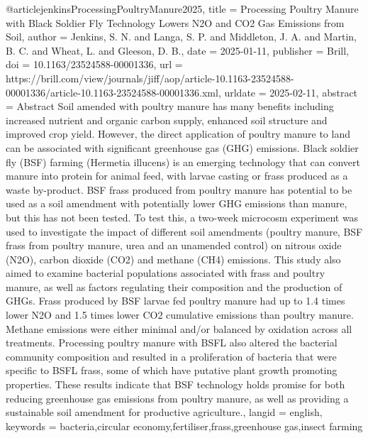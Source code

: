 {{{{@article{jenkinsProcessingPoultryManure2025,
  title = {Processing Poultry Manure with Black Soldier Fly Technology Lowers {{N2O}} and {{CO2}} Gas Emissions from Soil},
  author = {Jenkins, S. N. and Langa, S. P. and Middleton, J. A. and Martin, B. C. and Wheat, L. and Gleeson, D. B.},
  date = {2025-01-11},
  publisher = {Brill},
  doi = {10.1163/23524588-00001336},
  url = {https://brill.com/view/journals/jiff/aop/article-10.1163-23524588-00001336/article-10.1163-23524588-00001336.xml},
  urldate = {2025-02-11},
  abstract = {Abstract Soil amended with poultry manure has many benefits including increased nutrient and organic carbon supply, enhanced soil structure and improved crop yield. However, the direct application of poultry manure to land can be associated with significant greenhouse gas (GHG) emissions. Black soldier fly (BSF) farming (Hermetia illucens) is an emerging technology that can convert manure into protein for animal feed, with larvae casting or frass produced as a waste by-product. BSF frass produced from poultry manure has potential to be used as a soil amendment with potentially lower GHG emissions than manure, but this has not been tested. To test this, a two-week microcosm experiment was used to investigate the impact of different soil amendments (poultry manure, BSF frass from poultry manure, urea and an unamended control) on nitrous oxide (N2O), carbon dioxide (CO2) and methane (CH4) emissions. This study also aimed to examine bacterial populations associated with frass and poultry manure, as well as factors regulating their composition and the production of GHGs. Frass produced by BSF larvae fed poultry manure had up to 1.4 times lower N2O and 1.5 times lower CO2 cumulative emissions than poultry manure. Methane emissions were either minimal and/or balanced by oxidation across all treatments. Processing poultry manure with BSFL also altered the bacterial community composition and resulted in a proliferation of bacteria that were specific to BSFL frass, some of which have putative plant growth promoting properties. These results indicate that BSF technology holds promise for both reducing greenhouse gas emissions from poultry manure, as well as providing a sustainable soil amendment for productive agriculture.},
  langid = {english},
  keywords = {bacteria,circular economy,fertiliser,frass,greenhouse gas,insect farming}
}

}}}}
